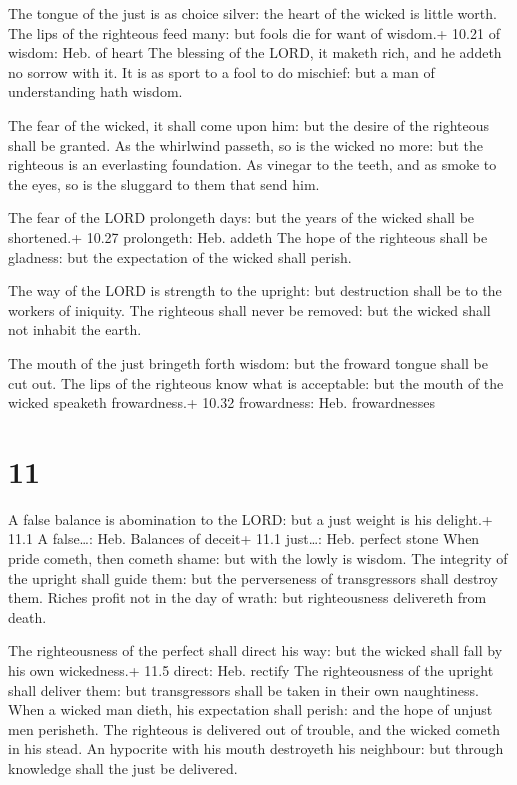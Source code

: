 The tongue of the just is as choice silver: the heart of
the wicked is little worth.  The lips of the righteous feed
many: but fools die for want of wisdom.+ 10.21 of wisdom: Heb. of heart
 The blessing of the LORD, it maketh rich, and he addeth no
sorrow with it.  It is as sport to a fool to do mischief:
but a man of understanding hath wisdom.

 The fear of the wicked, it shall come upon him: but the
desire of the righteous shall be granted.  As the whirlwind
passeth, so is the wicked no more: but the righteous is an everlasting
foundation.  As vinegar to the teeth, and as smoke to the
eyes, so is the sluggard to them that send him.

 The fear of the LORD prolongeth days: but the years of the
wicked shall be shortened.+ 10.27 prolongeth: Heb. addeth 
The hope of the righteous shall be gladness: but the expectation of the
wicked shall perish.

 The way of the LORD is strength to the upright: but
destruction shall be to the workers of iniquity.  The
righteous shall never be removed: but the wicked shall not inhabit the
earth.

 The mouth of the just bringeth forth wisdom: but the
froward tongue shall be cut out.  The lips of the righteous
know what is acceptable: but the mouth of the wicked speaketh
frowardness.+ 10.32 frowardness: Heb. frowardnesses

\hypertarget{section-10}{%
\section{11}\label{section-10}}

 A false balance is abomination to the LORD: but a just
weight is his delight.+ 11.1 A false\ldots: Heb. Balances of deceit+
11.1 just\ldots: Heb. perfect stone  When pride cometh, then
cometh shame: but with the lowly is wisdom.  The integrity
of the upright shall guide them: but the perverseness of transgressors
shall destroy them.  Riches profit not in the day of wrath:
but righteousness delivereth from death.

 The righteousness of the perfect shall direct his way: but
the wicked shall fall by his own wickedness.+ 11.5 direct: Heb. rectify
 The righteousness of the upright shall deliver them: but
transgressors shall be taken in their own naughtiness.  When
a wicked man dieth, his expectation shall perish: and the hope of unjust
men perisheth.  The righteous is delivered out of trouble,
and the wicked cometh in his stead.  An hypocrite with his
mouth destroyeth his neighbour: but through knowledge shall the just be
delivered.

